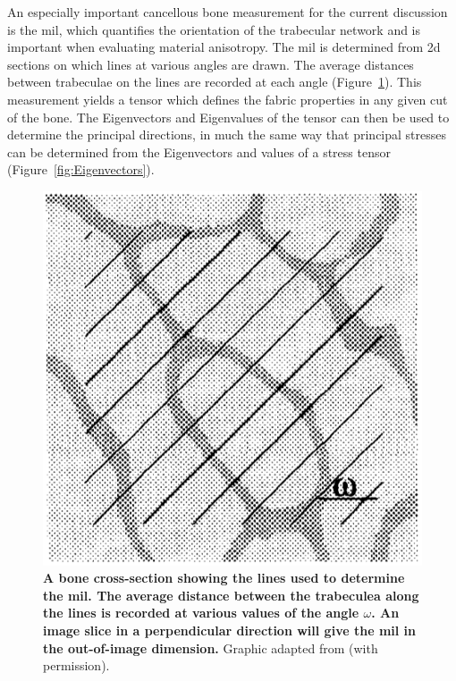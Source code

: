 An especially important cancellous bone measurement for the current discussion is the \ac{mil}, which quantifies the orientation of the trabecular network and is important when evaluating material anisotropy.
The \ac{mil} is determined from \ac{2d} sections on which lines at various angles are drawn. The average distances between trabeculae on the lines are recorded at each angle (Figure~\ref{fig:Odgaard_MIL}).
This measurement yields a tensor which defines the fabric properties in any given cut of the bone.
The Eigenvectors and Eigenvalues of the tensor can then be used to determine the principal directions, in much the same way that principal stresses can be determined from the Eigenvectors and values of a stress tensor (Figure~\ref{fig:Eigenvectors}).

\begin{figure}
\includegraphics[width=\hsize]{./intro/Figures/Odgaard_MIL}
\caption[Determination of \acs*{mil}]{\textbf{A bone cross-section showing the lines used to determine the \acs{mil}. The average distance between the trabeculea along the lines is recorded at various values of the angle $\omega$. An image slice in a perpendicular direction will give the \ac{mil} in the out-of-image dimension.} Graphic adapted from \citet{odgaard_three-dimensional_1997} (with permission).}
\label{fig:Odgaard_MIL}
\end{figure}

